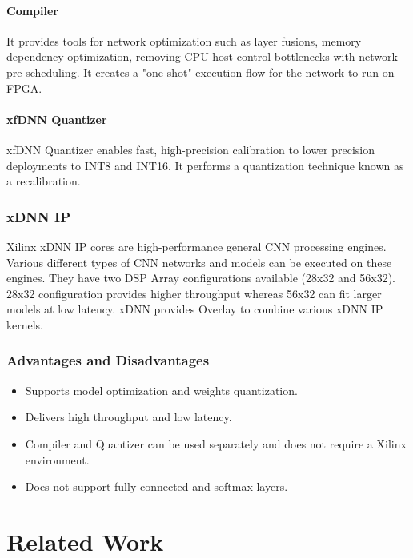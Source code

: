 \documentclass[titlepage]{report}
\begin{document}
\subsubsection{Compiler}

It provides tools for network optimization such as layer fusions, memory dependency optimization, removing CPU host control bottlenecks with network pre-scheduling. It creates a "one-shot" execution flow for the network to run on FPGA.

\subsubsection{xfDNN Quantizer} 

xfDNN Quantizer enables fast, high-precision calibration to lower precision deployments to INT8 and INT16. It performs a quantization technique known as a recalibration.

\subsection{xDNN IP}
Xilinx xDNN IP cores are high-performance general CNN processing engines. Various different types of CNN networks and models can be executed on these engines. They have two DSP Array configurations available (28x32 and 56x32). 28x32 configuration provides higher throughput whereas 56x32 can fit larger models at low latency.
xDNN provides Overlay to combine various xDNN IP kernels.

\subsection{Advantages and Disadvantages}
  
 \begin{itemize}
 \item Supports model optimization and weights quantization.
 \item Delivers high throughput and low latency.
 \item Compiler and Quantizer can be used separately and does not require a Xilinx environment.
 \item Does not support fully connected and softmax layers.
 
 \end{itemize}




\chapter{Related Work}
\lipsum[3]
\end{document}

